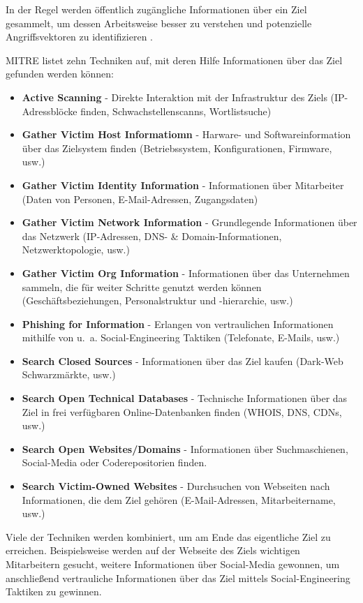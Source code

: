 \documentclass[conference]{IEEEtran}
\begin{document}
In der Regel werden öffentlich zugängliche Informationen über ein Ziel gesammelt, um dessen Arbeitsweise besser zu verstehen und potenzielle Angriffsvektoren zu identifizieren \cite{Cole2013}.

MITRE \cite{MITREReconnaissance} listet zehn Techniken auf, mit deren Hilfe Informationen über das Ziel gefunden werden können:
\begin{itemize}
    \item \textbf{Active Scanning} - Direkte Interaktion mit der Infrastruktur des Ziels (IP-Adressblöcke finden, Schwachstellenscanns, Wortlistsuche)
    \item \textbf{Gather Victim Host Informatiomn} - Harware- und Softwareinformation über das Zielsystem finden (Betriebssystem, Konfigurationen, Firmware, usw.)
    \item \textbf{Gather Victim Identity Information} - Informationen über Mitarbeiter (Daten von Personen, E-Mail-Adressen, Zugangsdaten)
    \item \textbf{Gather Victim Network Information} - Grundlegende Informationen über das Netzwerk (IP-Adressen, DNS- \& Domain-Informationen, Netzwerktopologie, usw.)
    \item \textbf{Gather Victim Org Information} - Informationen über das Unternehmen sammeln, die für weiter Schritte genutzt werden können (Geschäftsbeziehungen, Personalstruktur und -hierarchie, usw.)
    \item \textbf{Phishing for Information} - Erlangen von vertraulichen Informationen mithilfe von u.~a. Social-Engineering Taktiken (Telefonate, E-Mails, usw.)
    \item \textbf{Search Closed Sources} - Informationen über das Ziel kaufen (Dark-Web Schwarzmärkte, usw.)
    \item \textbf{Search Open Technical Databases} - Technische Informationen über das Ziel in frei verfügbaren Online-Datenbanken finden (WHOIS, DNS, CDNs, usw.)
    \item \textbf{Search Open Websites/Domains} - Informationen über Suchmaschienen, Social-Media oder Coderepositorien finden.
    \item \textbf{Search Victim-Owned Websites} - Durchsuchen von Webseiten nach Informationen, die dem Ziel gehören (E-Mail-Adressen, Mitarbeitername, usw.)
\end{itemize}
Viele der Techniken werden kombiniert, um am Ende das eigentliche Ziel zu erreichen.
Beispielsweise werden auf der Webseite des Ziels wichtigen Mitarbeitern gesucht, weitere Informationen über Social-Media gewonnen, um anschließend vertrauliche Informationen über das Ziel mittels Social-Engineering Taktiken zu gewinnen.
\end{document}
